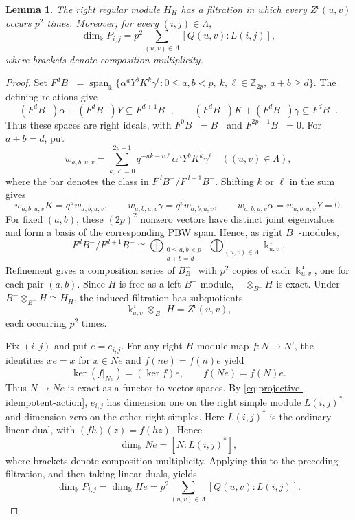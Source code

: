 \documentclass[10pt,oneside]{amsart}
\newcommand{\kk}{\Bbbk}
\newcommand{\Z}{\mathbb Z}
\newcommand{\Span}{\operatorname{span}}
\newtheorem{lemma}[proposition]{Lemma}
\theoremstyle{definition}
\def\a{\alpha}
\begin{document}
\begin{lemma}\label{lem:projective-dimension-filtration}
The right regular module $H_H$ has a filtration in which every
$Z^{\mathrm r}(u,v)$ occurs $p^2$ times. Moreover, for every
$(i,j)\in\Lambda$,
\[
 \dim_{\kk}P_{i,j}
 =p^2\sum_{(u,v)\in\Lambda}[Q(u,v):L(i,j)],
\]
where brackets denote composition multiplicity.
\end{lemma}
\begin{proof}
Set $
 F^dB^-=\Span_{\kk}\{\alpha^aY^bK^k\gamma^\ell:
 0\le a,b<p,\ k,\ell\in\Z_{2p},\ a+b\ge d\}.
$
The defining relations give
\[
 (F^dB^-)\alpha+(F^dB^-)Y\subseteq F^{d+1}B^-,
 \qquad
 (F^dB^-)K+(F^dB^-)\gamma\subseteq F^dB^-.
\]
Thus these spaces are right ideals, with $F^0B^-=B^-$ and
$F^{2p-1}B^-=0$. For $a+b=d$, put
\[
 w_{a,b;u,v}=\sum_{k,\ell=0}^{2p-1}q^{-uk-v\ell}
                 \overline{\alpha^aY^bK^k\gamma^\ell}
 \quad ((u,v)\in\Lambda),
\]
where the bar denotes the class in $F^dB^-/F^{d+1}B^-$. Shifting
$k$ or $\ell$ in the sum gives
\[
 w_{a,b;u,v}K=q^u w_{a,b;u,v},\qquad
 w_{a,b;u,v}\gamma=q^v w_{a,b;u,v},\qquad
 w_{a,b;u,v}\alpha=w_{a,b;u,v}Y=0.
\]
For fixed $(a,b)$, these $(2p)^2$ nonzero vectors have distinct
joint eigenvalues and form a basis of the corresponding PBW span.
Hence, as right $B^-$-modules,
\[
 F^dB^-/F^{d+1}B^-
 \cong \bigoplus_{\substack{0\le a,b<p\\a+b=d}}
       \ \bigoplus_{(u,v)\in\Lambda}\kk_{u,v}^{\,\mathrm r}.
\]
Refinement gives a composition series of $B^-_{B^-}$ with $p^2$
copies of each $\kk_{u,v}^{\,\mathrm r}$, one for each pair $(a,b)$.
Since $H$ is free as a left $B^-$-module, $-\otimes_{B^-}H$
is exact. Under $B^-\otimes_{B^-}H\cong H_H$, the induced filtration
has subquotients
\[
 \kk_{u,v}^{\,\mathrm r}\otimes_{B^-}H=Z^{\mathrm r}(u,v),
\]
each occurring $p^2$ times.

Fix $(i,j)$ and put $e=e_{i,j}$. For any right $H$-module map
$f:N\to N'$, the identities $xe=x$ for $x\in Ne$ and
$f(ne)=f(n)e$ yield
\[
 \ker(f|_{Ne})=(\ker f)e,\qquad f(Ne)=f(N)e.
\]
Thus $N\mapsto Ne$ is exact as a functor to vector spaces.
By \eqref{eq:projective-idempotent-action}, $e_{i,j}$ has dimension
one on the right simple module $L(i,j)^*$ and dimension zero on the
other right simples. Here $L(i,j)^*$ is the ordinary linear dual,
with $(fh)(z)=f(hz)$. Hence
\[
 \dim_{\kk}Ne=[N:L(i,j)^*],
\]
where brackets denote composition multiplicity. Applying this
to the preceding filtration, and then taking linear duals, yields
\begin{equation}\label{eq:projective-dimension-multiplicity}
 \dim_{\kk}P_{i,j}=\dim_{\kk}He
 =p^2\sum_{(u,v)\in\Lambda}[Q(u,v):L(i,j)].
\end{equation}

\end{proof}
\end{document}
